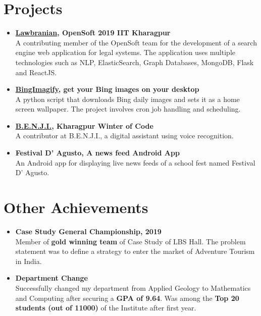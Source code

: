 \documentclass[a4paper,10pt]{article} %
\begin{document}

\section{\textcolor{sectiontitle}{Projects}}
\begin{itemize}
    \item \textbf{\href{https://github.com/lbs-iitkgp/Opensoft-2019}{Lawbranian}, OpenSoft 2019 IIT Kharagpur}\\
    A contributing member of the OpenSoft team for the development of a search engine web application for legal systems. The application uses multiple technologies such as NLP, ElasticSearch, Graph Databases, MongoDB, Flask and ReactJS.
    \item \textbf{\href{https://github.com/aribalam/BingImagify}{BingImagify}, get your Bing images on your desktop}\\
    A python script that downloads Bing daily images and sets it as a home screen wallpaper. The project involves cron job handling and scheduling.
    \item \textbf{\href{https://github.com/the-ethan-hunt/B.E.N.J.I.}{B.E.N.J.I.}, Kharagpur Winter of Code}\\
    A contributor at B.E.N.J.I., a digital assistant using voice recognition.
    \item \textbf{Festival D' Agusto, A news feed Android App}\\
    An Android app for displaying live news feeds of a school fest named Festival D' Agusto.
\end{itemize}


\section{\textcolor{sectiontitle}{Other Achievements}}
\begin{itemize}
    \item \textbf{Case Study General Championship, 2019}\\
    Member of \textbf{gold winning team} of Case Study of LBS Hall. The problem statement was to define a strategy to enter the market of Adventure Tourism in India.
    \item \textbf{Department Change}\\
    Successfully changed my department from Applied Geology to Mathematics and Computing after securing a \textbf{GPA of 9.64}. Was among the \textbf{Top 20 students (out of 11000)} of the Institute after first year.
\end{itemize}
\end{document}
